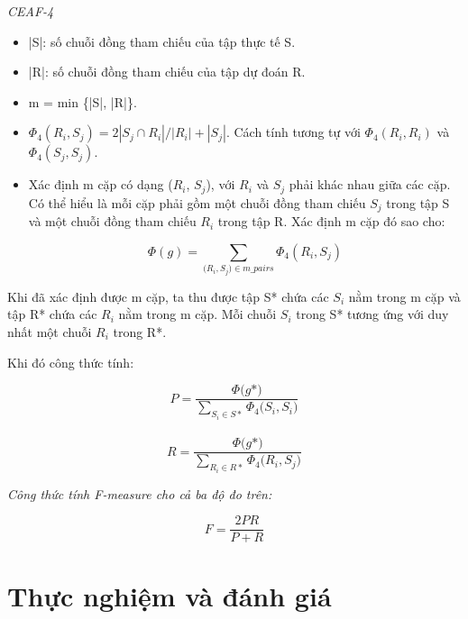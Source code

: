 \documentclass[12pt]{extarticle}
\begin{document}
					\textit{CEAF-4}
				\begin{itemize}
					\item{|S|: số chuỗi đồng tham chiếu của tập thực tế S.}
					\item{|R|: số chuỗi đồng tham chiếu của tập dự đoán R.}
					\item{m = min \{|S|, |R|\}.}
					\item{$\Phi_4(R_i,S_j) = 2 |S_j \cap R_i|/ |R_i| + |S_j|$. Cách tính tương tự với $\Phi_4(R_i,R_i)$ và $\Phi_4(S_j,S_j)$.}  
					\item{Xác định m cặp có dạng ($R_i$, $S_j$), với $R_i$ và $S_j$ phải khác nhau giữa các cặp. Có thể hiểu là mỗi cặp phải gồm một chuỗi đồng tham chiếu $S_j$ trong tập S và một chuỗi đồng tham chiếu $R_i$ trong tập R. Xác định m cặp đó sao cho: 
					\begin{center}
						\begin{equation*}
							\Phi(g) = \sum_{\big(R_i,S_j) \in m\_pairs} \Phi_4(R_i,S_j)
						\end{equation*}
					\end{center}}
				\end{itemize}
				\par Khi đã xác định được m cặp, ta thu được tập S* chứa các $S_i$ nằm trong m cặp và tập R* chứa các $R_i$ nằm trong m cặp. Mỗi chuỗi $S_i$ trong S* tương ứng với duy nhất một chuỗi $R_i$ trong R*.
				\par Khi đó công thức tính:						
					\begin{center}
						\begin{equation*}
							P = \frac{\Phi \big(g*)}{\sum_{S_i \in S*}\Phi_4 \big(S_i, S_i)}
						\end{equation*}
						\\
						\begin{equation*}
							R = \frac{\Phi \big(g*)}{\sum_{R_i \in R*}\Phi_4 \big(R_i, S_j)}
						\end{equation*}					
					\end{center}

			\par \textit{Công thức tính F-measure cho cả ba độ đo trên:}
				\begin{center}					
					\begin{equation*}
						F = \frac{2PR}{P+R}
					\end{equation*}
				\end{center}

	\section{Thực nghiệm và đánh giá}	
\end{document}
